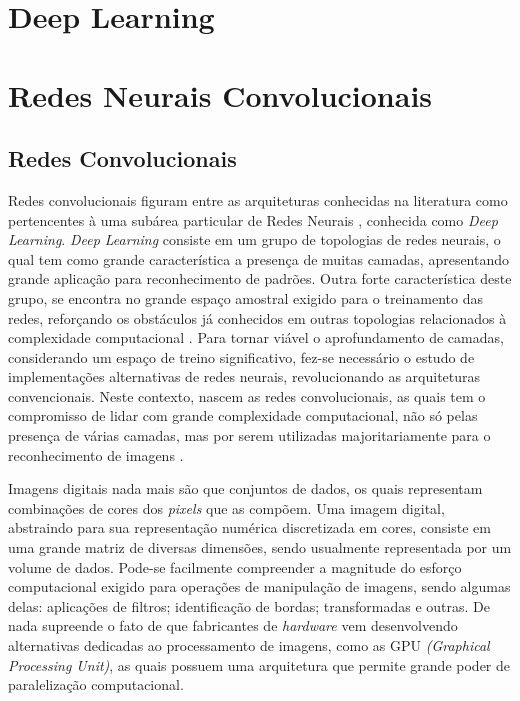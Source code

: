 \documentclass[
	12pt,				%
	oneside,			%
	a4paper,			%
	english,			%
	french,				%
	spanish,			%
	brazil,				%
	]{abntex2}
\begin{document}
\chapter{Deep Learning}

\chapter{Redes Neurais Convolucionais}

\section{Redes Convolucionais}
Redes convolucionais figuram entre as arquiteturas conhecidas na literatura como pertencentes à uma subárea particular de Redes Neurais , conhecida como \textit{Deep Learning}. \textit{Deep Learning} consiste em um grupo  de topologias de redes neurais, o qual tem como grande característica a presença de muitas camadas, apresentando grande aplicação para reconhecimento de padrões. Outra forte característica deste grupo, se encontra no grande espaço amostral exigido para o treinamento das redes, reforçando os obstáculos já conhecidos em outras topologias relacionados à complexidade computacional \cite{ref1}. Para tornar viável o aprofundamento de camadas, considerando um espaço de treino significativo, fez-se necessário o estudo de implementações alternativas de redes neurais, revolucionando as arquiteturas convencionais. Neste contexto, nascem as redes convolucionais, as quais tem o compromisso de lidar com grande complexidade computacional, não só pelas presença de várias camadas, mas por serem utilizadas majoritariamente para o reconhecimento de imagens \cite{ref3}.

Imagens digitais nada mais são que conjuntos de dados, os quais representam combinações de cores dos \textit{pixels} que as compõem. Uma imagem digital, abstraindo para sua representação numérica discretizada em cores, consiste em uma grande matriz de diversas dimensões, sendo usualmente representada por um volume de dados. Pode-se facilmente compreender a magnitude do esforço computacional exigido para operações de manipulação de imagens, sendo algumas delas: aplicações de filtros; identificação de bordas; transformadas e outras. De nada supreende o fato de que fabricantes de \textit{hardware} vem desenvolvendo alternativas dedicadas ao processamento de imagens, como as GPU \textit{(Graphical Processing Unit)}, as quais possuem uma arquitetura que permite grande poder de paralelização computacional.
\end{document}
